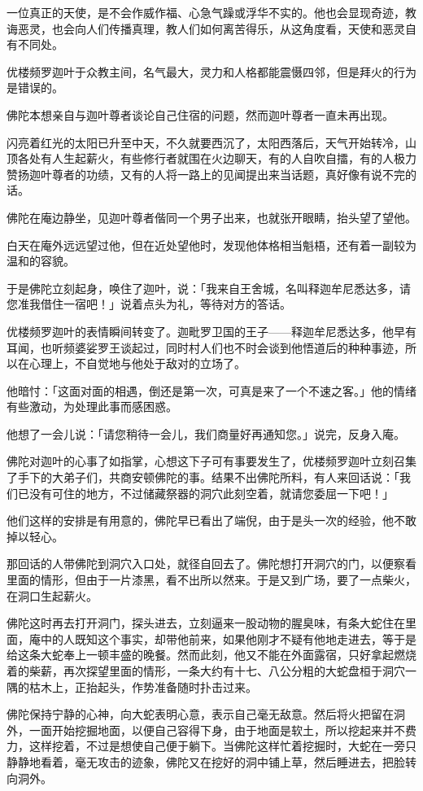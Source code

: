 \documentclass[12pt,twoside,openany]{book}
\begin{document}
一位真正的天使，是不会作威作福、心急气躁或浮华不实的。他也会显现奇迹，教诲恶灵，也会向人们传播真理，教人们如何离苦得乐，从这角度看，天使和恶灵自有不同处。

优楼频罗迦叶于众教主间，名气最大，灵力和人格都能震慑四邻，但是拜火的行为是错误的。

佛陀本想亲自与迦叶尊者谈论自己住宿的问题，然而迦叶尊者一直未再出现。

闪亮着红光的太阳已升至中天，不久就要西沉了，太阳西落后，天气开始转冷，山顶各处有人生起薪火，有些修行者就围在火边聊天，有的人自吹自擂，有的人极力赞扬迦叶尊者的功绩，又有的人将一路上的见闻提出来当话题，真好像有说不完的话。

佛陀在庵边静坐，见迦叶尊者偕同一个男子出来，也就张开眼睛，抬头望了望他。

白天在庵外远远望过他，但在近处望他时，发现他体格相当魁梧，还有着一副较为温和的容貌。

于是佛陀立刻起身，唤住了迦叶，说：「我来自王舍城，名叫释迦牟尼悉达多，请您准我借住一宿吧！」说着点头为礼，等待对方的答话。

优楼频罗迦叶的表情瞬间转变了。迦毗罗卫国的王子——释迦牟尼悉达多，他早有耳闻，也听频婆娑罗王谈起过，同时村人们也不时会谈到他悟道后的种种事迹，所以在心理上，不自觉地与他处于敌对的立场了。

他暗忖：「这面对面的相遇，倒还是第一次，可真是来了一个不速之客。」他的情绪有些激动，为处理此事而感困惑。

他想了一会儿说：「请您稍待一会儿，我们商量好再通知您。」说完，反身入庵。

佛陀对迦叶的心事了如指掌，心想这下子可有事要发生了，优楼频罗迦叶立刻召集了手下的大弟子们，共商安顿佛陀的事。结果不出佛陀所料，有人来回话说：「我们已没有可住的地方，不过储藏祭器的洞穴此刻空着，就请您委屈一下吧！」

他们这样的安排是有用意的，佛陀早已看出了端倪，由于是头一次的经验，他不敢掉以轻心。

那回话的人带佛陀到洞穴入口处，就径自回去了。佛陀想打开洞穴的门，以便察看里面的情形，但由于一片漆黑，看不出所以然来。于是又到广场，要了一点柴火，在洞口生起薪火。

佛陀这时再去打开洞门，探头进去，立刻逼来一股动物的腥臭味，有条大蛇住在里面，庵中的人既知这个事实，却带他前来，如果他刚才不疑有他地走进去，等于是给这条大蛇奉上一顿丰盛的晚餐。然而此刻，他又不能在外面露宿，只好拿起燃烧着的柴薪，再次探望里面的情形，一条大约有十七、八公分粗的大蛇盘桓于洞穴一隅的枯木上，正抬起头，作势准备随时扑击过来。

佛陀保持宁静的心神，向大蛇表明心意，表示自己毫无敌意。然后将火把留在洞外，一面开始挖掘地面，以便自己容得下身，由于地面是软土，所以挖起来并不费力，这样挖着，不过是想使自己便于躺下。当佛陀这样忙着挖掘时，大蛇在一旁只静静地看着，毫无攻击的迹象，佛陀又在挖好的洞中铺上草，然后睡进去，把脸转向洞外。
\end{document}
